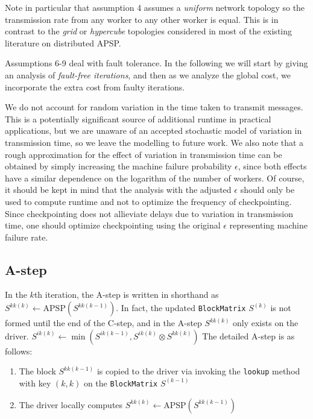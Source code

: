 \documentclass{article} %
\begin{document}
Note in particular that assumption 4 assumes a \emph{uniform} network
topology so the transmission rate from any worker to any other worker
is equal.  This is in contrast to the \emph{grid} or \emph{hypercube}
topologies considered in most of the existing literature on
distributed APSP.

Assumptions 6-9 deal with fault tolerance.  In the following we will
start by giving an analysis of \emph{fault-free iterations}, and then
as we analyze the global cost, we incorporate the extra cost from
faulty iterations.

We do not account for random variation in the time taken to transmit
messages.  This is a potentially significant source of additional
runtime in practical applications, but we are unaware of an accepted
stochastic model of variation in transmission time, so we leave the
modelling to future work.  We also note that a rough approximation for
the effect of variation in transmission time can be obtained by simply
increasing the machine failure probability $\epsilon$, since both
effects have a similar dependence on the logarithm of the number of
workers.  Of course, it should be kept in mind that the analysis with
the adjusted $\epsilon$ should only be used to compute runtime and not
to optimize the frequency of checkpointing.  Since checkpointing does
not allieviate delays due to variation in transmission time, one
should optimize checkpointing using the original $\epsilon$
representing machine failure rate.

\subsection{A-step}

In the $k$th iteration, the A-step is written in shorthand as
$S^{kk(k)} \leftarrow \text{APSP}(S^{kk(k-1)})$.  In fact, the updated
{\tt BlockMatrix} $S^{(k)}$ is not formed until the end of the C-step,
and in the A-step $S^{kk(k)}$ only exists on the driver.
$S^{ik(k)} \leftarrow \min(S^{ik(k-1)}, S^{ik(k)} \otimes S^{kk(k)})$
The detailed A-step is as follows:
\begin{enumerate}
\item The block $S^{kk(k-1)}$ is copied to the driver via invoking the {\tt lookup} method with key $(k, k)$ on the {\tt  BlockMatrix} $S^{(k-1)}$
\item The driver locally computes $S^{kk(k)} \leftarrow \text{APSP}(S^{kk(k-1)})$
\end{enumerate}
\end{document}
